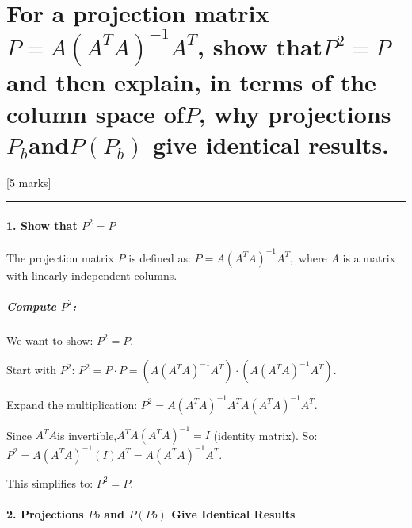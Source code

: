 \documentclass[11pt]{article}
\begin{document}
    \section{\texorpdfstring{For a projection matrix
\(P = A(A^T A)^{-1} A^T\), show that\(P^2 = P\)and then explain, in
terms of the column space of\(P\), why projections \(P_b\)and\(P(P_b)\)
give identical
results.}{For a projection matrix P = A(A\^{}T A)\^{}\{-1\} A\^{}T, show thatP\^{}2 = Pand then explain, in terms of the column space ofP, why projections P\_bandP(P\_b) give identical results.}}\label{for-a-projection-matrix-p-aat-a-1-at-show-thatp2-pand-then-explain-in-terms-of-the-column-space-ofp-why-projections-p_bandpp_b-give-identical-results.}

{[}5 marks{]}

    \begin{center}\rule{0.5\linewidth}{0.5pt}\end{center}

\paragraph{\texorpdfstring{\textbf{1. Show that
\(P^2 = P\)}}{1. Show that P\^{}2 = P}}\label{show-that-p2-p}

The projection matrix \(P\) is defined as: \(P = A (A^T A)^{-1} A^T,\)
where \(A\) is a matrix with linearly independent columns.

\subparagraph{\texorpdfstring{\textbf{Compute
\(P^2\):}}{Compute P\^{}2:}}\label{compute-p2}

We want to show: \(P^2 = P.\)

Start with \(P^2\):
\(P^2 = P \cdot P = \left( A (A^T A)^{-1} A^T \right) \cdot \left( A (A^T A)^{-1} A^T \right).\)

Expand the multiplication:
\(P^2 = A (A^T A)^{-1} A^T A (A^T A)^{-1} A^T.\)

Since \(A^T A\)is invertible,\(A^T A (A^T A)^{-1} = I\) (identity
matrix). So: \(P^2 = A (A^T A)^{-1} (I) A^T = A (A^T A)^{-1} A^T.\)

This simplifies to: \(P^2 = P.\)

\paragraph{\texorpdfstring{\textbf{2. Projections \(Pb\) and \(P(Pb)\)
Give Identical
Results}}{2. Projections Pb and P(Pb) Give Identical Results}}\label{projections-pb-and-ppb-give-identical-results}
\end{document}
